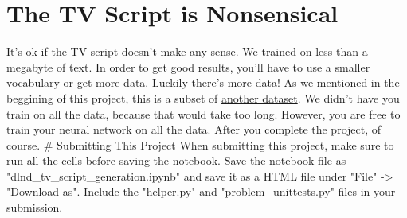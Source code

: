 \documentclass[11pt]{article}
\begin{document}
    \section{The TV Script is
Nonsensical}\label{the-tv-script-is-nonsensical}

It's ok if the TV script doesn't make any sense. We trained on less than
a megabyte of text. In order to get good results, you'll have to use a
smaller vocabulary or get more data. Luckily there's more data! As we
mentioned in the beggining of this project, this is a subset of
\href{https://www.kaggle.com/wcukierski/the-simpsons-by-the-data}{another
dataset}. We didn't have you train on all the data, because that would
take too long. However, you are free to train your neural network on all
the data. After you complete the project, of course. \# Submitting This
Project When submitting this project, make sure to run all the cells
before saving the notebook. Save the notebook file as
"dlnd\_tv\_script\_generation.ipynb" and save it as a HTML file under
"File" -\textgreater{} "Download as". Include the "helper.py" and
"problem\_unittests.py" files in your submission.


    
    
    
    
\end{document}
